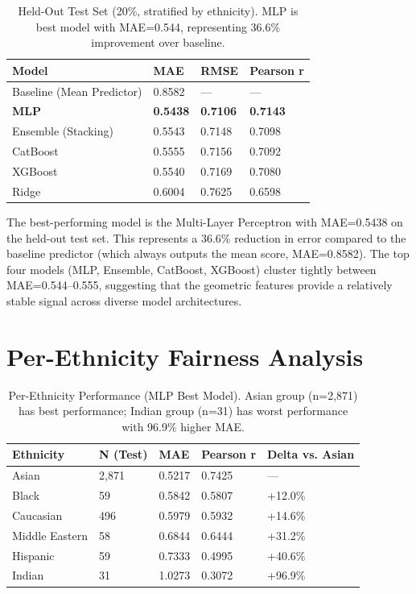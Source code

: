 \documentclass[a4paper,oneside,bibliography=totoc]{scrbook}
\begin{document}
\begin{table}[tb]
  \centering
  \small
  \begin{tabularx}{\textwidth}{lXXX}
    \toprule
    \textbf{Model} & \textbf{MAE} & \textbf{RMSE} & \textbf{Pearson r} \\
    \midrule
    Baseline (Mean Predictor) & 0.8582 & --- & --- \\
    \midrule
    \textbf{MLP} & \textbf{0.5438} & \textbf{0.7106} & \textbf{0.7143} \\
    Ensemble (Stacking) & 0.5543 & 0.7148 & 0.7098 \\
    CatBoost & 0.5555 & 0.7156 & 0.7092 \\
    XGBoost & 0.5540 & 0.7169 & 0.7080 \\
    Ridge & 0.6004 & 0.7625 & 0.6598 \\
    \bottomrule
  \end{tabularx}
  \caption{Held-Out Test Set (20\%, stratified by ethnicity). MLP is best model with MAE=0.544, representing 36.6\% improvement over baseline.}
  \label{tab:best_models}
\end{table}

The best-performing model is the Multi-Layer Perceptron with MAE=0.5438 on the held-out test set. This represents a 36.6\% reduction in error compared to the baseline predictor (which always outputs the mean score, MAE=0.8582). The top four models (MLP, Ensemble, CatBoost, XGBoost) cluster tightly between MAE=0.544--0.555, suggesting that the geometric features provide a relatively stable signal across diverse model architectures.

\section{Per-Ethnicity Fairness Analysis}

\begin{table}[tb]
  \centering
  \small
  \begin{tabularx}{\textwidth}{lXXXX}
    \toprule
    \textbf{Ethnicity} & \textbf{N (Test)} & \textbf{MAE} & \textbf{Pearson r} & \textbf{Delta vs. Asian} \\
    \midrule
    Asian & 2,871 & 0.5217 & 0.7425 & --- \\
    Black & 59 & 0.5842 & 0.5807 & +12.0\% \\
    Caucasian & 496 & 0.5979 & 0.5932 & +14.6\% \\
    Middle Eastern & 58 & 0.6844 & 0.6444 & +31.2\% \\
    Hispanic & 59 & 0.7333 & 0.4995 & +40.6\% \\
    Indian & 31 & 1.0273 & 0.3072 & +96.9\% \\
    \bottomrule
  \end{tabularx}
  \caption{Per-Ethnicity Performance (MLP Best Model). Asian group (n=2,871) has best performance; Indian group (n=31) has worst performance with 96.9\% higher MAE.}
  \label{tab:fairness}
\end{table}
\end{document}
